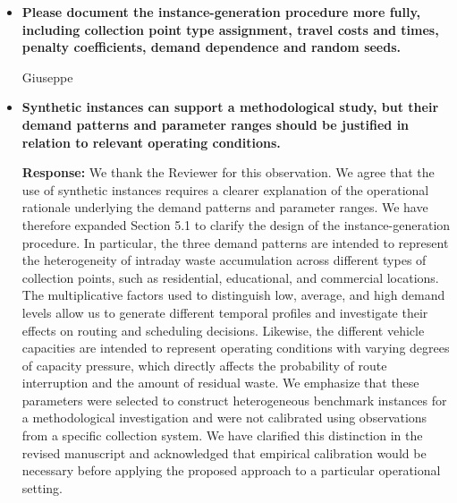 \documentclass[11pt]{article}
\begin{document}
\begin{enumerate}
\begin{itemize}
The computational experiments are intended to provide a controlled comparison of the proposed optimization procedures under a common scenario-based representation of uncertainty. We recognize that increasing the number of scenarios and evaluating the resulting solutions on independent demand realizations would provide a stronger assessment of their out-of-sample performance and robustness. We have therefore clarified the scope of the computational results and explicitly acknowledged these limitations in the revised manuscript. In particular, we avoid interpreting the reported scenario-based objective values as definitive estimates of the expected costs under the full demand distribution.


\item \textbf{Please document the instance-generation procedure more fully, including collection point
type assignment, travel costs and times, penalty coefficients, demand dependence and random seeds.}

Giuseppe

\item \textbf{Synthetic instances can support a methodological study, but their demand patterns and
parameter ranges should be justified in relation to relevant operating conditions.}


\noindent\textbf{Response:} We thank the Reviewer for this observation. We agree that the use of synthetic instances requires a clearer explanation of the operational rationale underlying the demand patterns and parameter ranges. We have therefore expanded Section 5.1 to clarify the design of the instance-generation procedure. In particular, the three demand patterns are intended to represent the heterogeneity of intraday waste accumulation across different types of collection points, such as residential, educational, and commercial locations. The multiplicative factors used to distinguish low, average, and high demand levels allow us to generate different temporal profiles and investigate their effects on routing and scheduling decisions. Likewise, the different vehicle capacities are intended to represent operating conditions with varying degrees of capacity pressure, which directly affects the probability of route interruption and the amount of residual waste. We emphasize that these parameters were selected to construct heterogeneous benchmark instances for a methodological investigation and were not calibrated using observations from a specific collection system. We have clarified this distinction in the revised manuscript and acknowledged that empirical calibration would be necessary before applying the proposed approach to a particular operational setting.



\end{itemize}
\end{enumerate}
\end{document}
